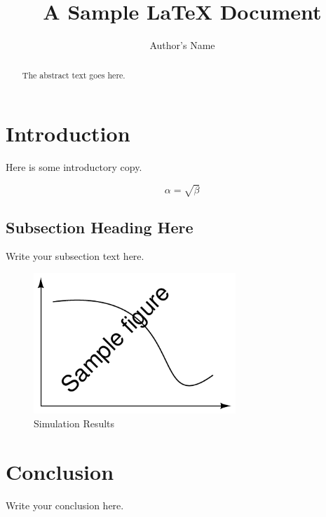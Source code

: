 \documentclass{article}
\begin{document}
\title{A Sample \LaTeX{} Document}
\author{Author's Name}

\maketitle

\begin{abstract}
The abstract text goes here.
\end{abstract}

\section{Introduction}
Here is some introductory copy.

\begin{equation}
    \label{simple_equation}
    \alpha = \sqrt{ \beta }
\end{equation}

\subsection{Subsection Heading Here}
Write your subsection text here.

\begin{figure}
    \centering
    \includegraphics[width=3.0in]{figure}
    \caption{Simulation Results}
    \label{simulationfigure}
\end{figure}

\section{Conclusion}
Write your conclusion here.
\end{document}
